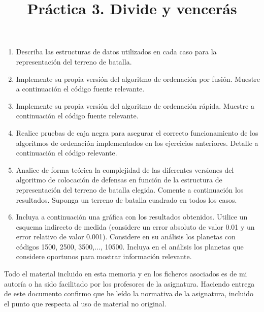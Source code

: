 \documentclass[]{article}
\title{Práctica 3. Divide y vencerás}
\author{}
\begin{document}
\maketitle


%

\begin{enumerate}
\item Describa las estructuras de datos utilizados en cada caso para la representación del terreno de batalla. 



\item Implemente su propia versión del algoritmo de ordenación por fusión. Muestre a continuación el código fuente relevante. 




\item Implemente su propia versión del algoritmo de ordenación rápida. Muestre a continuación el código fuente relevante. 



\item Realice pruebas de caja negra para asegurar el correcto funcionamiento de los algoritmos de ordenación implementados en los ejercicios anteriores. Detalle a continuación el código relevante.



\item Analice de forma teórica la complejidad de las diferentes versiones del algoritmo de colocación de defensas en función de la estructura de representación del terreno de batalla elegida. Comente a continuación los resultados. Suponga un terreno de batalla cuadrado en todos los casos. 



\item Incluya a continuación una gráfica con los resultados obtenidos. Utilice un esquema indirecto de medida (considere un error absoluto de valor 0.01 y un error relativo de valor 0.001). Considere en su análisis los planetas con códigos 1500, 2500, 3500,..., 10500. Incluya en el análisis los planetas que considere oportunos para mostrar información relevante.



\end{enumerate}

Todo el material incluido en esta memoria y en los ficheros asociados es de mi autoría o ha sido facilitado por los profesores de la asignatura. Haciendo entrega de este documento confirmo que he leído la normativa de la asignatura, incluido el punto que respecta al uso de material no original.
\end{document}
